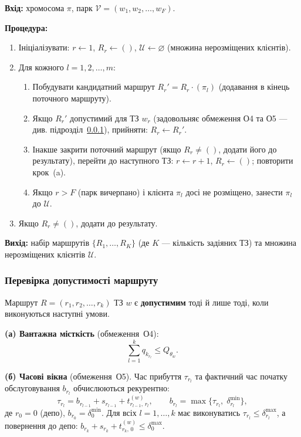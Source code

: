 \documentclass[14pt,a4paper]{extarticle}
\theoremstyle{definition}
\theoremstyle{plain}
\begin{document}
\textbf{Вхід:} хромосома $\pi$, парк $\mathcal{V} = (w_1, w_2, \ldots, w_F)$.

\textbf{Процедура:}
\begin{enumerate}[leftmargin=2em]
    \item Ініціалізувати: $r \leftarrow 1$, $R_r \leftarrow ()$, $\mathcal{U} \leftarrow \varnothing$ (множина нерозміщених клієнтів).
    \item Для кожного $l = 1, 2, \ldots, m$:
    \begin{enumerate}[label=(\alph*), leftmargin=2em]
        \item Побудувати кандидатний маршрут $R_r' = R_r \cdot (\pi_l)$ (додавання в кінець поточного маршруту).
        \item Якщо $R_r'$ допустимий для ТЗ $w_r$ (задовольняє обмеження О4 та О5 --- див. підрозділ~\ref{subsec:feasibility}), прийняти: $R_r \leftarrow R_r'$.
        \item Інакше закрити поточний маршрут (якщо $R_r \neq ()$, додати його до результату), перейти до наступного ТЗ: $r \leftarrow r+1$, $R_r \leftarrow ()$; повторити крок~(a).
        \item Якщо $r > F$ (парк вичерпано) і клієнта $\pi_l$ досі не розміщено, занести $\pi_l$ до $\mathcal{U}$.
    \end{enumerate}
    \item Якщо $R_r \neq ()$, додати до результату.
\end{enumerate}

\textbf{Вихід:} набір маршрутів $\{R_1, \ldots, R_K\}$ (де $K$ --- кількість задіяних ТЗ) та множина нерозміщених клієнтів $\mathcal{U}$.

\subsubsection{Перевірка допустимості маршруту}\label{subsec:feasibility}

Маршрут $R = (r_1, r_2, \ldots, r_k)$ ТЗ $w$ є \textbf{допустимим} тоді й лише тоді, коли виконуються наступні умови.

\textbf{(а) Вантажна місткість} (обмеження~О4):
\[
    \sum_{l=1}^{k} q_{k_{r_l}} \leq Q_{\theta_w}.
\]

\textbf{(б) Часові вікна} (обмеження~О5). Час прибуття $\tau_{r_l}$ та фактичний час початку обслуговування $b_{r_l}$ обчислюються рекурентно:
\[
    \tau_{r_l} = b_{r_{l-1}} + s_{r_{l-1}} + t_{r_{l-1},\, r_l}^{(w)},
    \qquad
    b_{r_l} = \max\bigl\{\tau_{r_l},\; \delta_{r_l}^{\min}\bigr\},
\]
де $r_0 = 0$ (депо), $b_{r_0} = \delta_0^{\min}$. Для всіх $l = 1, \ldots, k$ має виконуватись $\tau_{r_l} \leq \delta_{r_l}^{\max}$, а повернення до депо: $b_{r_k} + s_{r_k} + t_{r_k,\, 0}^{(w)} \leq \delta_0^{\max}$.
\end{document}
